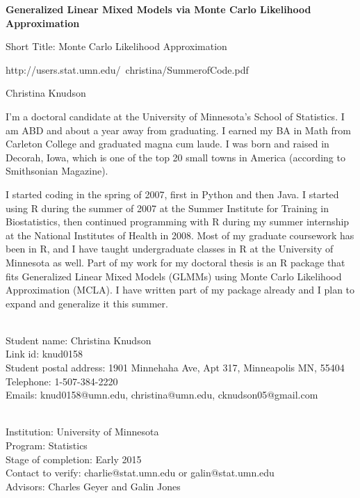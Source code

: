 \documentclass[12pt]{article}
\author{}
\date{}
\begin{document}
 \centerline{\large \bf Generalized Linear Mixed Models via Monte Carlo Likelihood Approximation}
 
 \centerline{\large  Short Title: Monte Carlo Likelihood Approximation}
 
 \centerline{ http://users.stat.umn.edu/~christina/SummerofCode.pdf}
 \centerline{Christina Knudson}
 \medskip
 

I'm a doctoral candidate at the University of Minnesota's School of Statistics.  I am ABD and about a year away from graduating.  I earned my BA in Math from Carleton College and graduated magna cum laude.  I was born and raised in Decorah, Iowa, which is one of the top 20 small towns in America (according to Smithsonian Magazine).  

I started coding in the spring of 2007, first in Python and then Java. I started using R during the summer of 2007 at the Summer Institute for Training in Biostatistics, then continued programming with R during my summer internship at the National Institutes of Health in 2008.  Most of my graduate coursework has been in R, and I have taught undergraduate classes in R at the University of Minnesota as well.  Part of my work for my doctoral thesis is an R package that fits Generalized Linear Mixed Models (GLMMs) using Monte Carlo Likelihood Approximation (MCLA).  I have written part of my package already and I plan to expand and generalize it this summer.
 \medskip

\\
Student name: Christina Knudson\\
Link id: knud0158\\
Student postal address: 1901 Minnehaha Ave, Apt 317, Minneapolis MN, 55404\\
Telephone: 1-507-384-2220\\
Emails: knud0158@umn.edu, christina@umn.edu, cknudson05@gmail.com

 \medskip

\\
Institution: University of Minnesota\\
Program: Statistics \\
Stage of completion: Early 2015 \\
Contact to verify: charlie@stat.umn.edu or galin@stat.umn.edu\\
Advisors: Charles Geyer and Galin Jones
 \medskip
\end{document}
